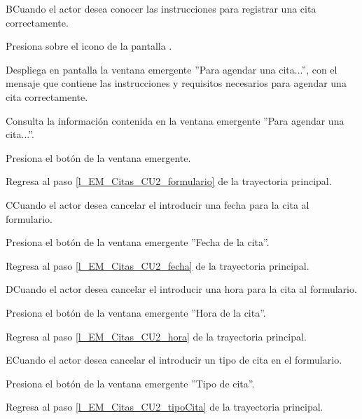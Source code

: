 \begin{UCtrayectoriaA}{B}{Cuando el actor desea conocer las instrucciones para registrar una cita correctamente.}

	\UCpaso Presiona sobre el icono  de la pantalla .

	\UCpaso Despliega en pantalla la ventana emergente ''Para agendar una cita...'', con el mensaje  que contiene las instrucciones y requisitos necesarios para agendar una cita correctamente.

	\UCpaso [\UCactor] Consulta la información contenida en la ventana emergente ''Para agendar una cita...''.

	\UCpaso [\UCactor] Presiona el botón  de la ventana emergente.

	\UCpaso Regresa al paso \ref{l_EM_Citas_CU2_formulario} de la trayectoria principal. 

\end{UCtrayectoriaA}

\begin{UCtrayectoriaA}{C}{Cuando el actor desea cancelar el introducir una fecha para la cita al formulario.}

	\UCpaso [\UCactor] Presiona el botón  de la ventana emergente ''Fecha de la cita''.

	\UCpaso Regresa al paso \ref{l_EM_Citas_CU2_fecha} de la trayectoria principal.
	
\end{UCtrayectoriaA}

\begin{UCtrayectoriaA}{D}{Cuando el actor desea cancelar el introducir una hora para la cita al formulario.}

	\UCpaso [\UCactor] Presiona el botón  de la ventana emergente ''Hora de la cita''. 

	\UCpaso Regresa al paso \ref{l_EM_Citas_CU2_hora} de la trayectoria principal.
	
\end{UCtrayectoriaA}

\begin{UCtrayectoriaA}{E}{Cuando el actor desea cancelar el introducir un tipo de cita en el formulario.}

	\UCpaso [\UCactor] Presiona el botón  de la ventana emergente ''Tipo de cita''. 

	\UCpaso Regresa al paso \ref{l_EM_Citas_CU2_tipoCita} de la trayectoria principal.
	
\end{UCtrayectoriaA}